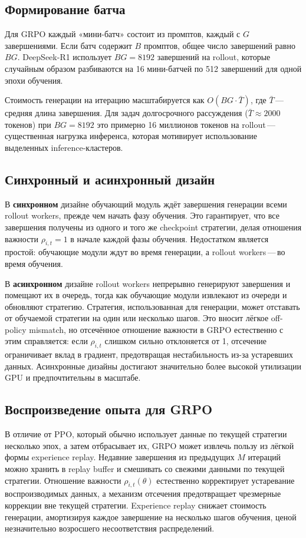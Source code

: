 \subsection{Формирование батча}

Для GRPO каждый «мини-батч» состоит из промптов, каждый с $G$ завершениями. Если батч содержит $B$ промптов, общее число завершений равно $BG$. DeepSeek-R1 использует $BG = 8192$ завершений на rollout, которые случайным образом разбиваются на 16 мини-батчей по 512 завершений для одной эпохи обучения.

Стоимость генерации на итерацию масштабируется как $O(BG \cdot \bar{T})$, где $\bar{T}$\,---\,средняя длина завершения. Для задач долгосрочного рассуждения ($\bar{T} \approx 2000$ токенов) при $BG = 8192$ это примерно 16 миллионов токенов на rollout\,---\,существенная нагрузка инференса, которая мотивирует использование выделенных inference-кластеров.

\subsection{Синхронный и асинхронный дизайн}

В \textbf{синхронном} дизайне обучающий модуль ждёт завершения генерации всеми rollout workers, прежде чем начать фазу обучения. Это гарантирует, что все завершения получены из одного и того же checkpoint стратегии, делая отношения важности $\rho_{i,t} = 1$ в начале каждой фазы обучения. Недостатком является простой: обучающие модули ждут во время генерации, а rollout workers\,---\,во время обучения.

В \textbf{асинхронном} дизайне rollout workers непрерывно генерируют завершения и помещают их в очередь, тогда как обучающие модули извлекают из очереди и обновляют стратегию. Стратегия, использованная для генерации, может отставать от обучаемой стратегии на один или несколько шагов. Это вносит лёгкое off-policy mismatch, но отсечённое отношение важности в GRPO естественно с этим справляется: если $\rho_{i,t}$ слишком сильно отклоняется от 1, отсечение ограничивает вклад в градиент, предотвращая нестабильность из-за устаревших данных. Асинхронные дизайны достигают значительно более высокой утилизации GPU и предпочтительны в масштабе.

\subsection{Воспроизведение опыта для GRPO}

В отличие от PPO, который обычно использует данные по текущей стратегии несколько эпох, а затем отбрасывает их, GRPO может извлечь пользу из лёгкой формы experience replay. Недавние завершения из предыдущих $M$ итераций можно хранить в replay buffer и смешивать со свежими данными по текущей стратегии. Отношение важности $\rho_{i,t}(\theta)$ естественно корректирует устаревание воспроизводимых данных, а механизм отсечения предотвращает чрезмерные коррекции вне текущей стратегии. Experience replay снижает стоимость генерации, амортизируя каждое завершение на несколько шагов обучения, ценой незначительно возросшего несоответствия распределений.

